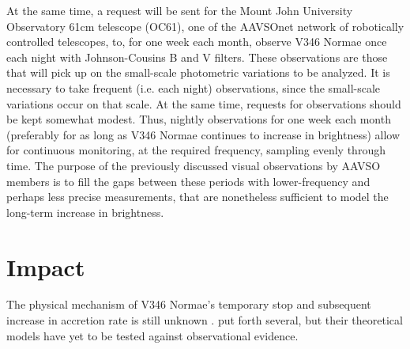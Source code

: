 \documentclass[iop,apj,tighten]{emulateapj}
\begin{document}
At the same time, a request will be sent for the Mount John University Observatory 61cm telescope (OC61), one of the AAVSOnet network of robotically controlled telescopes, to, for one week each month, observe V346 Normae once each night with Johnson-Cousins B and V filters. These observations are those that will pick up on the small-scale photometric variations to be analyzed. It is necessary to take frequent (i.e. each night) observations, since the small-scale variations occur on that scale. At the same time, requests for observations should be kept somewhat modest. Thus, nightly observations  for one week each month (preferably for as long as V346 Normae continues to increase in brightness) allow for continuous monitoring, at the required frequency, sampling evenly through time. The purpose of the previously discussed visual observations by AAVSO members is to fill the gaps between these periods with lower-frequency and perhaps less precise measurements, that are nonetheless sufficient to model the long-term increase in brightness.

\section{Impact}
The physical mechanism of V346 Normae's temporary stop and subsequent increase in accretion rate is still unknown \citep{kospal2017brightness}. \cite{ninan2015v899} put forth several, but their theoretical models have yet to be tested against observational evidence.


\newpage



\end{document}
